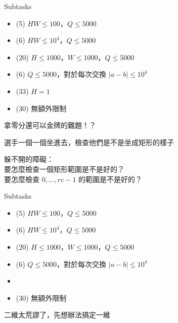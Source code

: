 \begin{frame}{}
    \begin{problem}
        Subtasks

        \begin{itemize}
            \item (5) $HW \le 100$，$Q \le 5000$
            \item (6) $HW \le 10^4$，$Q \le 5000$
            \item (20) $H \le 1000$，$W \le 1000$，$Q \le 5000$
            \item (6) $Q \le 5000$，對於每次交換 $|a - b| \le 10^4$
            \item (33) $H = 1$
            \item (30) 無額外限制
        \end{itemize}
    \end{problem}
    
    拿零分還可以金牌的難題！？
\end{frame}

\begin{frame}{}
    選手一個一個坐進去，檢查他們是不是坐成矩形的樣子

    躲不開的障礙：\\
    要怎麼檢查一個矩形範圍是不是好的？\\
    要怎麼檢查 $0, \dots, rc - 1$ 的範圍是不是好的？
\end{frame}

\begin{frame}{}
    \begin{problem}
        Subtasks

        \begin{itemize}
            \item (5) $HW \le 100$，$Q \le 5000$
            \item (6) $HW \le 10^4$，$Q \le 5000$
            \item (20) $H \le 1000$，$W \le 1000$，$Q \le 5000$
            \item (6) $Q \le 5000$，對於每次交換 $|a - b| \le 10^4$
            \item {}
            \item (30) 無額外限制
        \end{itemize}
    \end{problem}

    二維太荒謬了，先想辦法搞定一維

\end{frame}

